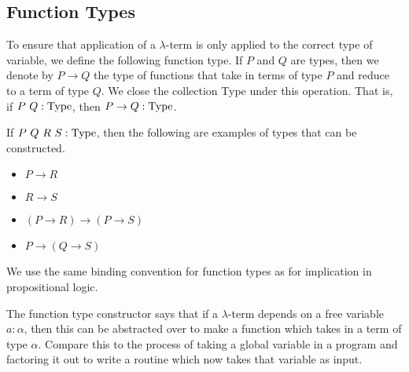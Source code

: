 \documentclass{book}
\begin{document}
    \newpage
    \subsection*{Function Types}

        To ensure that application of a $\lambda$-term is only applied to the correct type of variable, we define the following function type. If $P$ and $Q$ are types, then we denote by $P \to Q$ the type of functions that take in terms of type $P$ and reduce to a term of type $Q$. We close the collection Type under this operation. That is, if $P \ Q : \text{Type}$, then $P \to Q : \text{Type}$.

        \begin{eg}

            If $P \ Q \ R \ S : \text{Type}$, then the following are examples of types that can be constructed. 

                \begin{itemize}
                    \item[] $P \to R$
                    \item[] $R \to S$ 
                    \item[] $(P \to R) \to (P \to S)$
                    \item[] $P \to (Q \to S)$
                \end{itemize}
            
            We use the same binding convention for function types as for implication in propositional logic. 
        \end{eg}

        The function type constructor says that if a $\lambda$-term depends on a free variable $a : \alpha$, then this can be abstracted over to make a function which takes in a term of type $\alpha$. Compare this to the process of taking a global variable in a program and factoring it out to write a routine which now takes that variable as input. 
\end{document}
